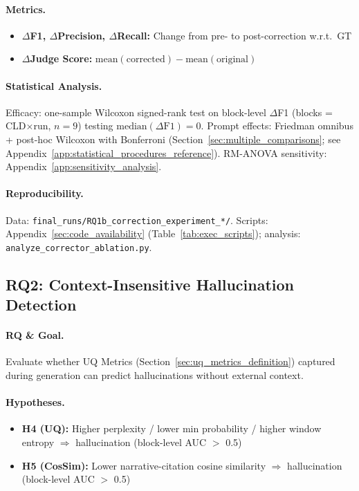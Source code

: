 \paragraph{Metrics.}
\begin{itemize}[noitemsep]
    \item \textbf{$\Delta$F1, $\Delta$Precision, $\Delta$Recall:} Change from pre- to post-correction w.r.t.\ GT
    \item \textbf{$\Delta$Judge Score:} $\text{mean}(\text{corrected}) - \text{mean}(\text{original})$
\end{itemize}

\paragraph{Statistical Analysis.}
Efficacy: one-sample Wilcoxon signed-rank test on block-level $\Delta$F1 (blocks = CLD$\times$run, $n=9$) testing $\mathrm{median}(\Delta\mathrm{F1})=0$. Prompt effects: Friedman omnibus + post-hoc Wilcoxon with Bonferroni (Section~\ref{sec:multiple_comparisons}; see Appendix~\ref{app:statistical_procedures_reference}). RM-ANOVA sensitivity: Appendix~\ref{app:sensitivity_analysis}.

\paragraph{Reproducibility.}
Data: \texttt{final\_runs/RQ1b\_correction\_experiment\_*/}. Scripts: Appendix~\ref{sec:code_availability} (Table~\ref{tab:exec_scripts}); analysis: \texttt{analyze\_corrector\_ablation.py}.

\subsection{RQ2: Context-Insensitive Hallucination Detection}
\label{sec:rq2_experiments}

\paragraph{RQ \& Goal.}
Evaluate whether UQ Metrics (Section~\ref{sec:uq_metrics_definition}) captured during generation can predict hallucinations without external context.

\paragraph{Hypotheses.}
\begin{itemize}[noitemsep]
    \item \textbf{H4 (UQ):} Higher perplexity / lower min probability / higher window entropy $\Rightarrow$ hallucination (block-level AUC $>$ 0.5)
    \item \textbf{H5 (CosSim):} Lower narrative-citation cosine similarity $\Rightarrow$ hallucination (block-level AUC $>$ 0.5)
\end{itemize}

